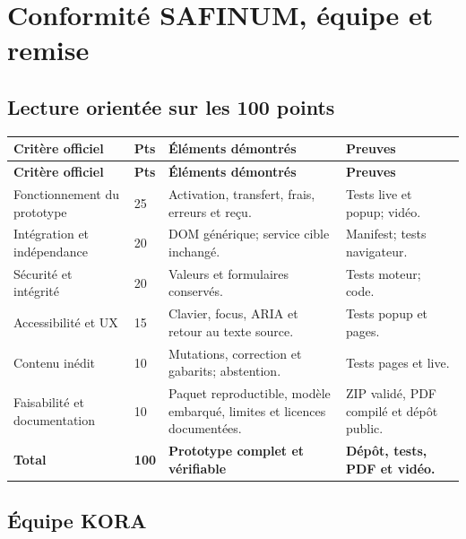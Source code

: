 \section{Conformité SAFINUM, équipe et remise}

\subsection{Lecture orientée sur les 100 points}

\begin{longtable}{@{}|L{45mm}|C{14mm}|L{55mm}|L{40mm}|@{}}
\hline
\textbf{Critère officiel} & \textbf{Pts} & \textbf{Éléments démontrés} &
\textbf{Preuves}\\
\hline
\endfirsthead
\hline
\textbf{Critère officiel} & \textbf{Pts} & \textbf{Éléments démontrés} &
\textbf{Preuves}\\
\hline
\endhead
Fonctionnement du prototype &
25 &
Activation, transfert, frais, erreurs et reçu. &
Tests live et popup; vidéo.\\
\hline
Intégration et indépendance &
20 &
DOM générique; service cible inchangé. &
Manifest; tests navigateur.\\
\hline
Sécurité et intégrité &
20 &
Valeurs et formulaires conservés. &
Tests moteur; code.\\
\hline
Accessibilité et UX &
15 &
Clavier, focus, ARIA et retour au texte source. &
Tests popup et pages.\\
\hline
Contenu inédit &
10 &
Mutations, correction et gabarits; abstention. &
Tests pages et live.\\
\hline
Faisabilité et documentation &
10 &
Paquet reproductible, modèle embarqué, limites et licences documentées. &
ZIP validé, PDF compilé et dépôt public.\\
\hline
\textbf{Total} & \textbf{100} & \textbf{Prototype complet et vérifiable} & \textbf{Dépôt, tests, PDF et vidéo.}\\
\hline
\end{longtable}

\subsection{Équipe KORA}

